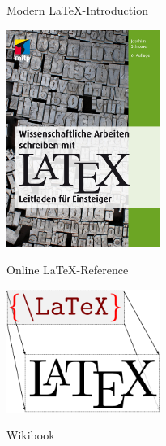 \begin{frame}{Modern \LaTeX-Introduction}
  \begin{center}
    \includegraphics[width=5cm]{buecher/schlosser}
  \end{center}
\end{frame}

\begin{frame}{Online \LaTeX-Reference}
  \begin{center}
    \includegraphics[width=5cm]{buecher/wikibook}

    \xxx

    \Huge Wikibook
  \end{center}
\end{frame}

